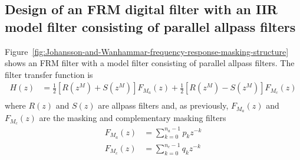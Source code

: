 \documentclass[a4paper,twoside,10pt,english]{report}
\begin{document}
\subsection{Design of  an FRM digital filter with an IIR model filter consisting of parallel allpass filters}
Figure~\ref{fig:Johansson-and-Wanhammar-frequency-response-masking-structure}
shows an FRM filter with a model filter consisting of parallel allpass filters.
The filter transfer function is
\begin{align*}
H\left(z\right)&= 
\frac{1}{2}\left[R\left(z^{M}\right)+S\left(z^{M}\right)\right]
F_{M_{a}}\left(z\right) +
\frac{1}{2}\left[R\left(z^{M}\right)-S\left(z^{M}\right)\right]
F_{M_{c}}\left(z\right)\\
\end{align*}
where $R\left(z\right)$ and $S\left(z\right)$ are allpass filters and, as
previously, $F_{M_{a}}\left(z\right)$ and $F_{M_{c}}\left(z\right)$ are the masking
and complementary masking filters
\begin{align*}
F_{M_{a}}\left(z\right)&=\sum_{k=0}^{n_{a}-1}p_{k}z^{-k}\\
F_{M_{c}}\left(z\right)&=\sum_{k=0}^{n_{c}-1}q_{k}z^{-k}
\end{align*}
 
\end{document}
